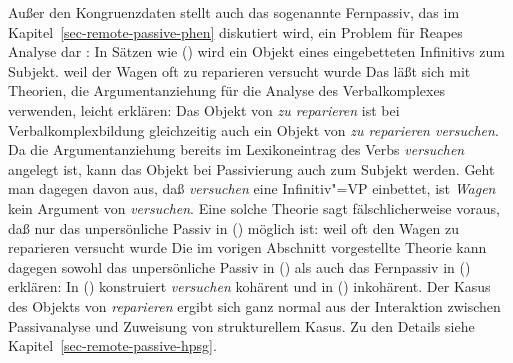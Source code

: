 {Außer den Kongruenzdaten stellt auch das sogenannte Fernpassiv, das im Kapitel~\ref{sec-remote-passive-phen}
diskutiert wird, ein Problem für Reapes Analyse dar \citep[Abschnitt~5.2]{Kathol98b}: In
Sätzen wie () wird ein Objekt eines eingebetteten Infinitivs zum Subjekt.
\ea
weil der Wagen oft zu reparieren versucht wurde
\z
Das läßt sich mit Theorien, die Argumentanziehung für die Analyse des Verbalkomplexes verwenden,
leicht erklären: Das Objekt von \emph{zu reparieren} ist bei Verbalkomplexbildung gleichzeitig
auch ein Objekt von \emph{zu reparieren versuchen}. Da die Argumentanziehung bereits im Lexikoneintrag
des Verbs \emph{versuchen} angelegt ist, kann das Objekt bei Passivierung auch zum Subjekt werden.
Geht man dagegen davon aus, daß \emph{versuchen} eine Infinitiv"=VP einbettet, ist \emph{Wagen}
kein Argument von \emph{versuchen}. Eine solche Theorie sagt fälschlicherweise voraus, daß nur das unpersönliche
Passiv in () möglich ist:
\ea
weil oft den Wagen zu reparieren versucht wurde
\z
Die im vorigen Abschnitt vorgestellte Theorie kann dagegen sowohl das unpersönliche Passiv
in () als auch das Fernpassiv in () erklären: In () konstruiert
\emph{versuchen} kohärent und in () inkohärent. Der Kasus des Objekts von \emph{reparieren}
ergibt sich ganz normal aus der Interaktion zwischen Passivanalyse und Zuweisung von strukturellem
Kasus. Zu den Details siehe Kapitel~\ref{sec-remote-passive-hpsg}.%



\begin{comment}
\subsection{Lexicalized Tree Adjoining Grammar und die Kompetenz/""Performanz"=Unterscheidung}

In der formalen Grammatiktheorie wird erforscht, welcher Komplexitätsklasse Grammatiken
angehören müssen, um natürliche Sprache adäquat beschreiben zu können. \citet{Chomsky56a-u} hat vier
Klassen definiert: die regulären Grammatiken, die kontextfreien Grammatiken, die kontextsensitiven
und die unrestringierten Grammatiken. Man ist sich inzwischen einig, dass kontextfreie Grammatiken
zwar große Ausschnitte von natürlichen Sprachen beschrieben können, aber nicht allen Phänomene in
allen Sprachen eine Analyse zuordnen können. Man ist sich relativ sicher, daß die natürlichen
Sprachen einer Teilklasse der kontextsensitiven Sprachen entsprechen. Eine solche Teilklasse sind
zum Beispiel die \emph{Mildly Context Sensitive Grammars}.


\end{comment}}

